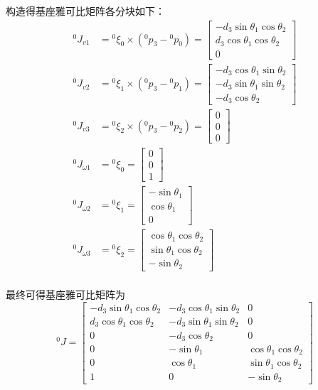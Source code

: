 \documentclass[UTF8, 13pt]{ctexart}
\begin{document}
构造得基座雅可比矩阵各分块如下：
\[
\begin{aligned}
    {}^0 J_{v1} &= {}^0\xi_0 \times ({}^0 p_3 - {}^0 p_0)
                = \begin{bmatrix}
                    -d_3 \sin\theta_1 \cos\theta_2 \\
                    d_3 \cos\theta_1 \cos\theta_2 \\
                    0
                \end{bmatrix} \\
    {}^0 J_{v2} &= {}^0\xi_1 \times ({}^0 p_3 - {}^0 p_1)
                = \begin{bmatrix}
                    -d_3 \cos\theta_1 \sin\theta_2 \\
                    -d_3 \sin\theta_1 \sin\theta_2 \\
                    -d_3 \cos\theta_2
                \end{bmatrix} \\
    {}^0 J_{v3} &= {}^0\xi_2 \times ({}^0 p_3 - {}^0 p_2)
                = \begin{bmatrix}
                    0 \\
                    0 \\
                    0
                \end{bmatrix} \\
    {}^0 J_{\omega1} &= {}^0\xi_0
                = \begin{bmatrix}
                    0 \\ 0 \\ 1
                \end{bmatrix} \\
    {}^0 J_{\omega2} &= {}^0\xi_1
                = \begin{bmatrix}
                    -\sin\theta_1 \\ \cos\theta_1 \\ 0
                \end{bmatrix} \\
    {}^0 J_{\omega3} &= {}^0\xi_2
                = \begin{bmatrix}
                    \cos\theta_1 \cos\theta_2 \\ \sin\theta_1 \cos\theta_2 \\ -\sin\theta_2
                \end{bmatrix} \\
\end{aligned}
\]

最终可得基座雅可比矩阵为
\[
{}^0 J =
\begin{bmatrix}
    -d_3 \sin\theta_1 \cos\theta_2 & -d_3 \cos\theta_1 \sin\theta_2 & 0 \\
    d_3 \cos\theta_1 \cos\theta_2 & -d_3 \sin\theta_1 \sin\theta_2 & 0 \\
    0 & -d_3 \cos\theta_2 & 0 \\
    0 & -\sin\theta_1 & \cos\theta_1 \cos\theta_2 \\
    0 & \cos\theta_1 & \sin\theta_1 \cos\theta_2 \\
    1 & 0 & -\sin\theta_2
\end{bmatrix}
\]
\end{document}
